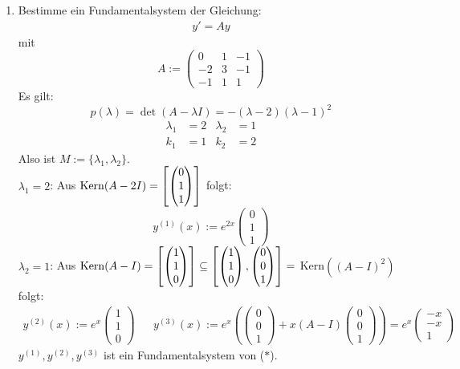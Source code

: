 \documentclass[a4paper,twoside,DIV15,BCOR12mm,chapterprefix=true,headings=twolinechapter]{scrbook}
\begin{document}
\begin{enumerate}
\item Bestimme ein Fundamentalsystem der Gleichung:
\begin{align*}
\tag{$\ast $} y' = Ay
\end{align*}
mit
\[A:=\begin{pmatrix} 0 & 1 & -1 \\ -2 & 3 & -1 \\ -1 & 1 & 1 \end{pmatrix}\]
Es gilt:
\[p(\lambda)=\det(A-\lambda I) = -(\lambda - 2)(\lambda - 1)^2\]
\begin{align*}
\lambda_1 &= 2 &\lambda_2&=1\\
k_1&=1 &k_2&=2
\end{align*}
Also ist $M := \{\lambda_1, \lambda_2\}$.\\
\boldmath $\lambda_1 = 2$\unboldmath: Aus $\mathop{\rm Kern}\nolimits(A-2I) = 
\left[ \begin{pmatrix} 0 \\ 1\\1 \end{pmatrix} \right]$ folgt:
\[y^{(1)}(x) := e^{2x}\begin{pmatrix} 0 \\ 1\\1 \end{pmatrix}\]
\boldmath $\lambda_2 = 1$\unboldmath: Aus $\mathop{\rm Kern}\nolimits(A-I) = 
\left[ \begin{pmatrix} 1 \\ 1\\0 \end{pmatrix} \right]
\subseteq \left[ \begin{pmatrix} 1\\1\\0 \end{pmatrix}, 
\begin{pmatrix} 0\\0\\1\end{pmatrix} \right] = $ Kern$((A -I)^2)$ folgt:
\begin{align*}
y^{(2)}(x) := e^x \begin{pmatrix} 1\\1\\0 \end{pmatrix} && 
y^{(3)}(x) := e^x\left( \begin{pmatrix} 0\\0\\1\end{pmatrix} + x(A-I) \begin{pmatrix} 0\\0\\1\end{pmatrix} \right) = e^x \begin{pmatrix} -x \\ -x \\ 1 \end{pmatrix}
\end{align*}
$y^{(1)}, y^{(2)}, y^{(3)}$ ist ein Fundamentalsystem von ($\ast$).


\end{enumerate}
\end{document}
